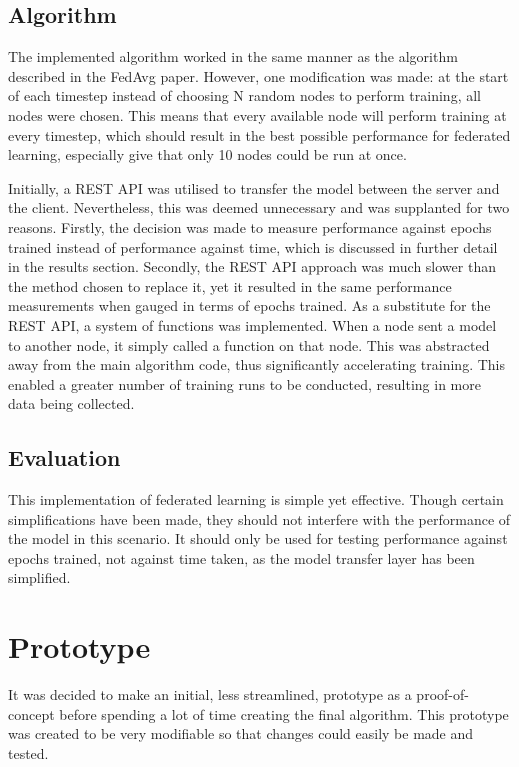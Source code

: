 \subsection{Algorithm}
The implemented algorithm worked in the same manner as the algorithm described in the FedAvg paper. However, one modification was made: at the start of each timestep instead of choosing N random nodes to perform training, all nodes were chosen. This means that every available node will perform training at every timestep, which should result in the best possible performance for federated learning, especially give that only 10 nodes could be run at once.

Initially, a REST API was utilised to transfer the model between the server and the client. Nevertheless, this was deemed unnecessary and was supplanted for two reasons. Firstly, the decision was made to measure performance against epochs trained instead of performance against time, which is discussed in further detail in the results section. Secondly, the REST API approach was much slower than the method chosen to replace it, yet it resulted in the same performance measurements when gauged in terms of epochs trained. As a substitute for the REST API, a system of functions was implemented. When a node sent a model to another node, it simply called a function on that node. This was abstracted away from the main algorithm code, thus significantly accelerating training. This enabled a greater number of training runs to be conducted, resulting in more data being collected.

\subsection{Evaluation}
This implementation of federated learning is simple yet effective. Though certain simplifications have been made, they should not interfere with the performance of the model in this scenario. It should only be used for testing performance against epochs trained, not against time taken, as the model transfer layer has been simplified.

\section{Prototype}
It was decided to make an initial, less streamlined, prototype as a proof-of-concept before spending a lot of time creating the final algorithm. This prototype was created to be very modifiable so that changes could easily be made and tested.


